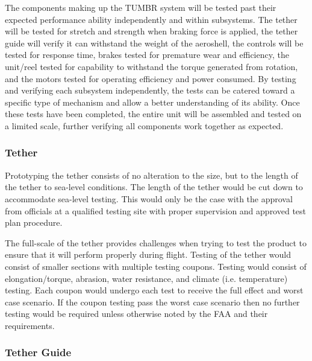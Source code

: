 \indent\indent The components making up the TUMBR system will be tested past their expected performance ability independently and within subsystems. The tether will be tested for stretch and strength when braking force is applied, the tether guide will verify it can withstand the weight of the aeroshell, the controls will be tested for response time, brakes tested for premature wear and efficiency, the unit/reel tested for capability to withstand the torque generated from rotation, and the motors tested for operating efficiency and power consumed. By testing and verifying each subsystem independently, the tests can be catered toward a specific type of mechanism and allow a better understanding of its ability. Once these tests have been completed, the entire unit will be assembled and tested on a limited scale, further verifying all components work together as expected.


\subsubsection{Tether}

\indent\indent Prototyping the tether consists of no alteration to the size, but to the length of the tether to sea-level conditions. The length of the tether would be cut down to accommodate sea-level testing. This would only be the case with the approval from officials at a qualified testing site with proper supervision and approved test plan procedure.

\indent\indent The full-scale of the tether provides challenges when trying to test the product to ensure that it will perform properly during flight. Testing of the tether would consist of smaller sections with multiple testing coupons. Testing would consist of elongation/torque, abrasion, water resistance, and climate (i.e. temperature) testing. Each coupon would undergo each test to receive the full effect and worst case scenario. If the coupon testing pass the worst case scenario then no further testing would be required unless otherwise noted by the FAA and their requirements.


\subsubsection{Tether Guide}

